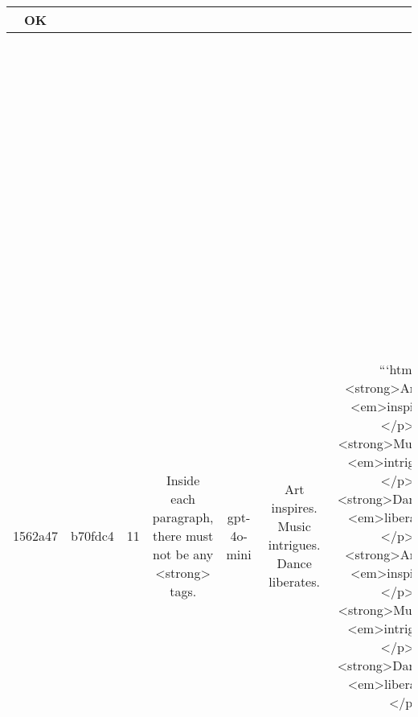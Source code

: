 \begin{table}[h!]
\begin{tabular}{|c|c|c|c|c|c|c|c|c|c|}
OK & \\
\hline
1562a47 & b70fdc4 & 11 & Inside each paragraph, there must not be any <strong> tags. & gpt-4o-mini & Art inspires. Music intrigues. Dance liberates. & ```html
<p><strong>Art</strong> <em>inspires</em>.</p>
<p><strong>Music</strong> <em>intrigues</em>.</p>
<p><strong>Dance</strong> <em>liberates</em>.</p>
<p><strong>Art</strong> <em>inspires</em>.</p>
<p><strong>Music</strong> <em>intrigues</em>.</p>
<p><strong>Dance</strong> <em>liberates</em>.</p>
``` & ok & The chatbot's output consists of six `<p>` tags, which satisfies the requirement of having at least three `<p>` tags. Each `<p>` tag contains one `<strong>` tag and multiple `<em>` tags, which complies with the description provided. There is no evident violation of the rules outlined in the description. Therefore, the output complies with the requirement of formatting a paragraph of text as HTML with each sentence wrapped in `<p>` tags and containing a `<strong>` tag and multiple `<em>` tags.

OK & \\
\hline
b4619c4 & b70fdc4 & 12 & Inside each paragraph, there must not be any <em> tags to emphasize key words and phrases. & gpt-4o-mini & Dawn breaks. Day progresses. Dusk sets. & ```html
<p><strong>Dawn</strong> <em>breaks</em>.</p>
<p><strong>Day</strong> <em>progresses</em>.</p>
<p><strong>Dusk</strong> <em>sets</em>.</p>
<p><strong>Dawn</strong> <em>breaks</em>.</p>
<p><strong>Day</strong> <em>progresses</em>.</p>
<p><strong>Dusk</strong> <em>sets</em>.</p>
``` & ok & The task requires the output to have individual sentences wrapped in separate `<p>` tags, with at least three `<p>` tags. Each `<p>` tag should contain one `<strong>` tag and multiple `<em>` tags to emphasize key words and phrases.

Upon reviewing the output:

1. The output contains six `<p>` tags, each containing its own sentence. This fulfills the requirement of having at least three `<p>` tags.

2. Each `<p>` tag contains exactly one `<strong>` tag, conforming to the requirement.

3. Each `<p>` tag also includes one `<em>` tag, which satisfies the requirement of having multiple `<em>` tags (since "multiple" includes the case where there is at least one in each).

No part of the description was violated in this output concerning the guidelines that do not require the input. 


\end{tabular}
\end{table}
